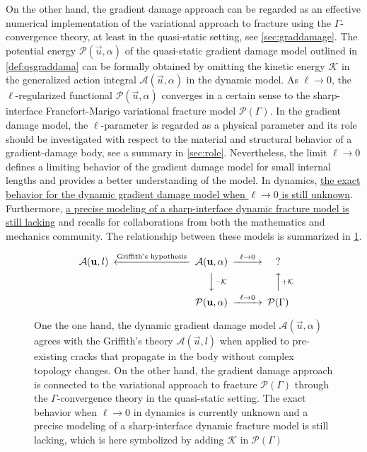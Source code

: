 On the other hand, the gradient damage approach can be regarded as an effective numerical implementation of the variational approach to fracture using the $\Gamma$-convergence theory, at least in the quasi-static setting, see \cref{sec:graddamage}. The potential energy $\mathcal{P}(\vec{u},\alpha)$ of the quasi-static gradient damage model outlined in \cref{def:qsgraddama} can be formally obtained by omitting the kinetic energy $\mathcal{K}$ in the generalized action integral $\mathcal{A}(\vec{u},\alpha)$ in the dynamic model. As $\ell\to 0$, the $\ell$-regularized functional $\mathcal{P}(\vec{u},\alpha)$ converges in a certain sense to the sharp-interface Francfort-Marigo variational fracture model $\mathcal{P}(\Gamma)$. In the gradient damage model, the $\ell$-parameter is regarded as a physical parameter and its role should be investigated with respect to the material and structural behavior of a gradient-damage body, see a summary in \cref{sec:role}. Nevertheless, the limit $\ell\to 0$ defines a limiting behavior of the gradient damage model for small internal lengths and provides a better understanding of the model. In dynamics, \uline{the exact behavior for the dynamic gradient damage model when $\ell\to 0$ is still unknown}. Furthermore, \uline{a precise modeling of a sharp-interface dynamic fracture model is still lacking} and recalls for collaborations from both the mathematics and mechanics community. The relationship between these models is summarized in \cref{fig:griffithvariagraddama}.
\begin{figure}[htbp]
\centering
\[
\begin{CD}
\mathcal{A}(\vec{u},l) @<\text{Griffith's hypothesis}<< \mathcal{A}(\vec{u},\alpha) @>{\ell\to 0}>> ? \\
@. @VV{-\mathcal{K}}V @AA{+\mathcal{K}}A \\
@. \mathcal{P}(\vec{u},\alpha) @>{\ell\to 0}>> \mathcal{P}(\Gamma)
\end{CD}
\]
\caption{One the one hand, the dynamic gradient damage model $\mathcal{A}(\vec{u},\alpha)$ agrees with the Griffith's theory $\mathcal{A}(\vec{u},l)$ when applied to pre-existing cracks that propagate in the body without complex topology changes. On the other hand, the gradient damage approach is connected to the variational approach to fracture $\mathcal{P}(\Gamma)$ through the $\Gamma$-convergence theory in the quasi-static setting. The exact behavior when $\ell\to 0$ in dynamics is currently unknown and a precise modeling of a sharp-interface dynamic fracture model is still lacking, which is here symbolized by adding $\mathcal{K}$ in $\mathcal{P}(\Gamma)$} \label{fig:griffithvariagraddama}
\end{figure}

